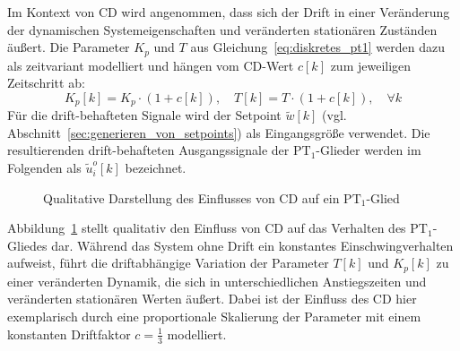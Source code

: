 Im Kontext von \ac{CD} wird angenommen, dass sich der Drift in einer Veränderung der dynamischen Systemeigenschaften und veränderten stationären Zuständen äußert. Die Parameter $K_p$ und $T$ aus Gleichung~\eqref{eq:diskretes_pt1} werden dazu als zeitvariant modelliert und hängen vom \ac{CD}-Wert $c[k]$ zum jeweiligen Zeitschritt ab:
%
\begin{equation}
    K_p[k] = K_p \cdot (1 + c[k]), \quad T[k] = T \cdot (1 + c[k]), \quad \forall k
\end{equation}
%
Für die drift-behafteten Signale wird der Setpoint $\tilde{w}[k]$
(vgl. Abschnitt~\ref{sec:generieren_von_setpoints}) als Eingangsgröße verwendet.
Die resultierenden drift-behafteten Ausgangssignale der $\mathrm{PT}_1$-Glieder
werden im Folgenden als $\tilde{u}_i^o[k]$ bezeichnet. \par
%
\begin{figure}[bt!]
    \centering
    \makebox[\textwidth][c]{%
        
    }
    \caption{Qualitative Darstellung des Einflusses von \ac{CD} auf ein $\mathrm{PT}_1$-Glied}
    \label{fig:pt1}
\end{figure}
%
Abbildung~\ref{fig:pt1} stellt qualitativ den Einfluss von \ac{CD} auf das Verhalten des $\mathrm{PT}_1$-Gliedes dar. Während das System ohne Drift ein konstantes Einschwingverhalten aufweist, führt die driftabhängige Variation der Parameter $T[k]$ und $K_p[k]$ zu einer veränderten Dynamik, die sich in unterschiedlichen Anstiegszeiten und veränderten stationären Werten äußert. Dabei ist der Einfluss des \ac{CD} hier exemplarisch durch eine proportionale Skalierung der Parameter mit einem konstanten Driftfaktor $c=\tfrac{1}{3}$ modelliert.
%
